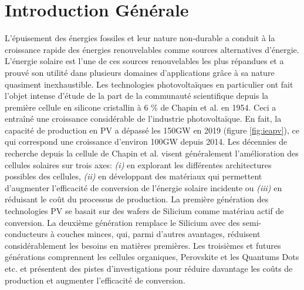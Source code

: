 \newpage
\tableofcontents
\newpage

\chapter*{Introduction Générale}
\label{sec:intro}
L’épuisement des énergies fossiles et leur nature non-durable a conduit à la croissance rapide des énergies renouvelables comme sources alternatives d'énergie. L’énergie solaire est l’une de ces sources renouvelables les plus répandues et a prouvé son utilité dans plusieurs domaines d'applications grâce à sa nature quasiment inexhaustible. Les technologies photovoltaïques en particulier ont fait l'objet intense d'étude de la part de la communauté scientifique depuis la première cellule en silicone cristallin à 6 \% de Chapin et al. \cite{Chapin1954} en 1954. Ceci a entraîné une croissance considérable de l'industrie photovoltaïque. En fait, la capacité de production en PV a dépassé les 150GW \cite{iea2020} en 2019 (figure \ref{fig:ieapv}), ce qui correspond une croissance d'environ 100GW depuis 2014. Les décennies de recherche depuis la cellule de Chapin et al. visent généralement l'amélioration des cellules solaires sur trois axes: \textit{(i)} en explorant les différentes architectures possibles des cellules, \textit{(ii)} en développant des matériaux qui permettent d'augmenter l'efficacité de conversion de l'énergie solaire incidente ou \textit{(iii)} en réduisant le coût du processus de production. La première génération des technologies PV se basait sur des wafers de Silicium comme matériau actif de conversion. La deuxième génération remplace le Silicium avec des semi-conducteurs à couches minces, qui, parmi d'autres avantages, réduisent considérablement les besoins en matières premières. Les troisièmes et futures générations comprennent les cellules organiques, Perovskite et les Quantums Dots etc. et présentent des pistes d'investigations pour réduire davantage les coûts de production et augmenter l'efficacité de conversion.

